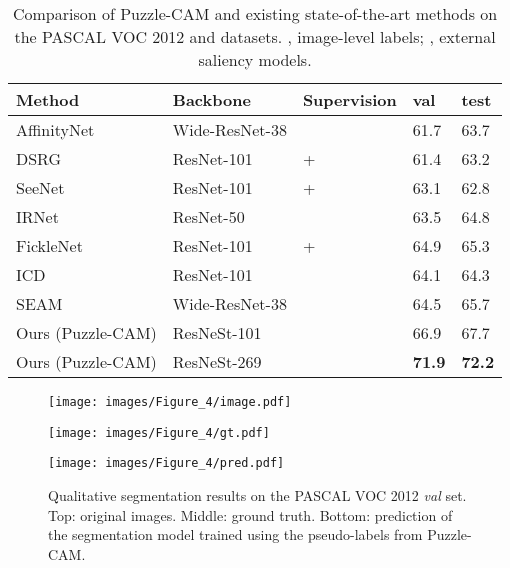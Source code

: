 \documentclass{article}
\begin{document}
\begin{table}[t]
\caption{
Comparison of Puzzle-CAM and existing state-of-the-art methods on the PASCAL VOC 2012  and  datasets. 
, image-level labels;  , external saliency models.
}
\footnotesize
\centering
{
\begin{tabu} to \linewidth{X[c,1.2] X[c,1.0] X[c,0.75]  | X[c,0.2]  X[c,0.2] }  \hline \hline
Method  & Backbone & Supervision & val & test \\ \hline
AffinityNet~\cite{ahn2018learning} & Wide-ResNet-38 &  & 61.7 & 63.7 \\
DSRG~\cite{huang2018weakly} & ResNet-101 &  +  & 61.4 & 63.2 \\ 
SeeNet~\cite{hou2018self} & ResNet-101 &  +  & 63.1 & 62.8 \\
IRNet~\cite{ahn2018learning} & ResNet-50 &  & 63.5 & 64.8 \\
FickleNet~\cite{lee2019ficklenet} & ResNet-101 &  +  & 64.9 & 65.3 \\ 
ICD~\cite{fan2020learning} & ResNet-101 &  & 64.1 & 64.3 \\ 
SEAM~\cite{Wang_2020_CVPR} & Wide-ResNet-38 &  & 64.5 & 65.7 \\ \hline
Ours (Puzzle-CAM) & ResNeSt-101 &  & 66.9 & 67.7 \\
Ours (Puzzle-CAM) & ResNeSt-269 &  & \textbf{71.9} & \textbf{72.2} \\

\hline\hline
\end{tabu}
}
\label{tb:final}
\end{table}

\begin{figure}
\begin{minipage}[b]{1.0\linewidth}
  \centering
  \centerline{\texttt{[image: images/Figure\_4/image.pdf]}}
\end{minipage}

\begin{minipage}[b]{1.0\linewidth}
  \centering
  \centerline{\texttt{[image: images/Figure\_4/gt.pdf]}}
\end{minipage}

\begin{minipage}[b]{1.0\linewidth}
  \centering
  \centerline{\texttt{[image: images/Figure\_4/pred.pdf]}}
\end{minipage}

\caption{Qualitative segmentation results on the PASCAL VOC 2012 \textit{val} set. Top: original images. Middle: ground truth. Bottom: prediction of the segmentation model trained using the pseudo-labels from Puzzle-CAM.}
\label{fig:result}
\end{figure}
\end{document}
